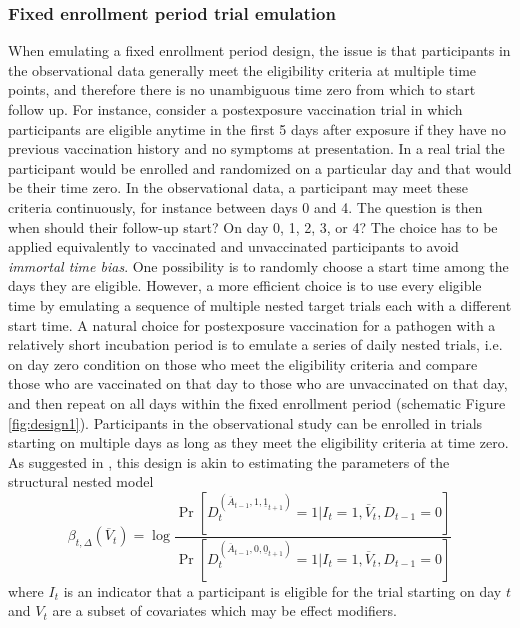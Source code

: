 \begin{appendices}
\begin{refsection}
    \subsubsection{Fixed enrollment period trial emulation}\label{sec:fixed_emulation}
    When emulating a fixed enrollment period design, the issue is that participants in the observational data generally meet the eligibility criteria at multiple time points, and therefore there is no unambiguous time zero from which to start follow up. For instance, consider a postexposure vaccination trial in which participants are eligible anytime in the first 5 days after exposure if they have no previous vaccination history and no symptoms at presentation. In a real trial the participant would be enrolled and randomized on a particular day and that would be their time zero. In the observational data, a participant may meet these criteria continuously, for instance between days 0 and 4. The question is then when should their follow-up start? On day 0, 1, 2, 3, or 4? The choice has to be applied equivalently to vaccinated and unvaccinated participants to avoid \textit{immortal time bias}. One possibility is to randomly choose a start time among the days they are eligible. However, a more efficient choice is to use every eligible time by emulating a sequence of multiple nested target trials each with a different start time. A natural choice for postexposure vaccination for a pathogen with a relatively short incubation period is to emulate a series of daily nested trials, i.e. on day zero condition on those who meet the eligibility criteria and compare those who are vaccinated on that day to those who are unvaccinated on that day, and then repeat on all days within the fixed enrollment period (schematic Figure \ref{fig:design1}). Participants in the observational study can be enrolled in trials starting on multiple days as long as they meet the eligibility criteria at time zero. As suggested in \cite{guo_discussion_2021-1}, this design is akin to estimating the parameters of the structural nested model
    \begin{equation*}
        \beta_{t, \Delta}(\overline{V}_t) = \log \frac{\Pr[D_t^{(\overline{A}_{t-1}, 1, \underline{1}_{t+1})}  = 1| I_t = 1, \overline{V}_t, D_{t-1} = 0]}{\Pr[D_t^{(\overline{A}_{t-1}, 0, \underline{0}_{t+1})} = 1 |  I_t = 1, \overline{V}_t, D_{t-1} = 0]}
    \end{equation*}
    where $I_t$ is an indicator that a participant is eligible for the trial starting on day $t$ and $V_t$ are a subset of covariates which may be effect modifiers.


\end{refsection}
\end{appendices}
